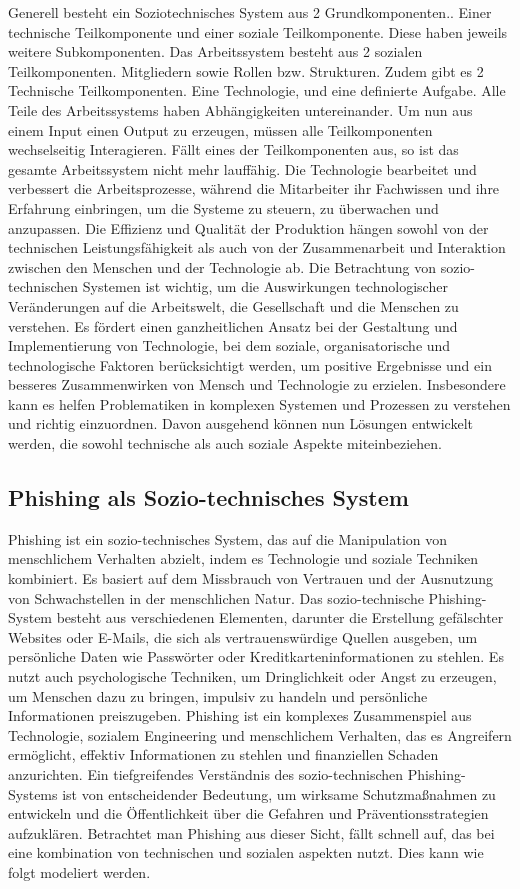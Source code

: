 \documentclass[journal=tosc,final]{iacrtrans}
\begin{document}
Generell besteht ein Soziotechnisches System aus 2 Grundkomponenten.. Einer technische Teilkomponente und einer soziale Teilkomponente. Diese haben jeweils weitere Subkomponenten. Das Arbeitssystem besteht aus 2 sozialen Teilkomponenten. Mitgliedern sowie Rollen bzw. Strukturen. Zudem gibt es 2 Technische Teilkomponenten. Eine Technologie, und eine definierte Aufgabe. Alle Teile des Arbeitssystems haben Abhängigkeiten untereinander. Um nun aus einem Input einen Output zu erzeugen, müssen alle Teilkomponenten wechselseitig Interagieren. Fällt eines der Teilkomponenten aus, so ist das gesamte Arbeitssystem nicht mehr lauffähig. Die Technologie bearbeitet und verbessert die Arbeitsprozesse, während die Mitarbeiter ihr Fachwissen und ihre Erfahrung einbringen, um die Systeme zu steuern, zu überwachen und anzupassen. Die Effizienz und Qualität der Produktion hängen sowohl von der technischen Leistungsfähigkeit als auch von der Zusammenarbeit und Interaktion zwischen den Menschen und der Technologie ab. Die Betrachtung von sozio-technischen Systemen ist wichtig, um die Auswirkungen technologischer Veränderungen auf die Arbeitswelt, die Gesellschaft und die Menschen zu verstehen. Es fördert einen ganzheitlichen Ansatz bei der Gestaltung und Implementierung von Technologie, bei dem soziale, organisatorische und technologische Faktoren berücksichtigt werden, um positive Ergebnisse und ein besseres Zusammenwirken von Mensch und Technologie zu erzielen. Insbesondere kann es helfen Problematiken in komplexen Systemen und Prozessen zu verstehen und richtig einzuordnen. Davon ausgehend können nun Lösungen entwickelt werden, die sowohl technische als auch soziale Aspekte miteinbeziehen.  
\newpage
\subsection{Phishing als Sozio-technisches System}
Phishing ist ein sozio-technisches System, das auf die Manipulation von menschlichem Verhalten abzielt, indem es Technologie und soziale Techniken kombiniert. Es basiert auf dem Missbrauch von Vertrauen und der Ausnutzung von Schwachstellen in der menschlichen Natur. Das sozio-technische Phishing-System besteht aus verschiedenen Elementen, darunter die Erstellung gefälschter Websites oder E-Mails, die sich als vertrauenswürdige Quellen ausgeben, um persönliche Daten wie Passwörter oder Kreditkarteninformationen zu stehlen. Es nutzt auch psychologische Techniken, um Dringlichkeit oder Angst zu erzeugen, um Menschen dazu zu bringen, impulsiv zu handeln und persönliche Informationen preiszugeben. Phishing ist ein komplexes Zusammenspiel aus Technologie, sozialem Engineering und menschlichem Verhalten, das es Angreifern ermöglicht, effektiv Informationen zu stehlen und finanziellen Schaden anzurichten. Ein tiefgreifendes Verständnis des sozio-technischen Phishing-Systems ist von entscheidender Bedeutung, um wirksame Schutzmaßnahmen zu entwickeln und die Öffentlichkeit über die Gefahren und Präventionsstrategien aufzuklären.
Betrachtet man Phishing aus dieser Sicht, fällt schnell auf, das bei eine kombination von technischen und sozialen aspekten nutzt. Dies kann wie folgt modeliert werden. 
\end{document}
